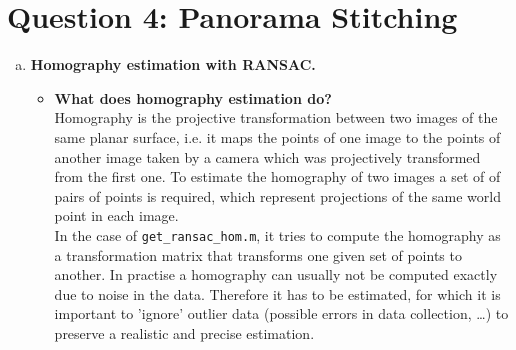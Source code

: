 \documentclass[12pt]{article}
\begin{document}
\section*{Question 4: Panorama Stitching}
\begin{enumerate}[a)]
	\item 
	\textbf{Homography estimation with RANSAC.}
     \begin{itemize}
     	\item
     	\textbf{What does homography estimation do?}\\
        Homography is the projective transformation between two images of the same planar surface, i.e. it maps the points of one image to the points of another image taken by a camera which was projectively transformed from the first one. To estimate the homography of two images a set of of pairs of points is required, which represent projections of the same world point in each image.\\
        In the case of \verb!get_ransac_hom.m!, it tries to compute the homography as a transformation matrix that transforms one given set of points to another.  In practise a homography can usually not be computed exactly due to noise in the data. Therefore it has to be estimated, for which it is important to 'ignore' outlier data (possible errors in data collection, \dots) to preserve a realistic and precise estimation.


\end{itemize}
\end{enumerate}
\end{document}
